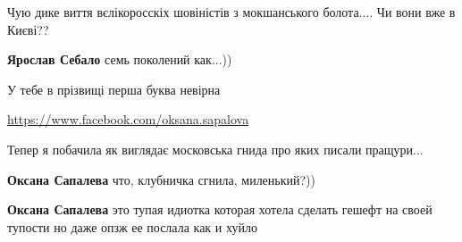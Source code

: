 \begin{itemize}
Чую дике виття вєлікоросскіх шовіністів з мокшанського болота.... Чи вони вже в
Києві??

\begin{itemize}
 
\textbf{Ярослав Себало} семь поколений как...))

 
У тебе в прізвищі перша буква невірна
\end{itemize}

\url{https://www.facebook.com/oksana.sapalova}\par
 
Тепер я побачила як виглядає московська гнида про яких писали пращури...

\begin{itemize}
 
\textbf{Оксана Сапалева} что, клубничка сгнила, миленький?))

 
\textbf{Оксана Сапалева} это тупая идиотка которая хотела сделать гешефт на своей тупости но даже опзж ее послала как и хуйло

 

\end{itemize}
\end{itemize}
